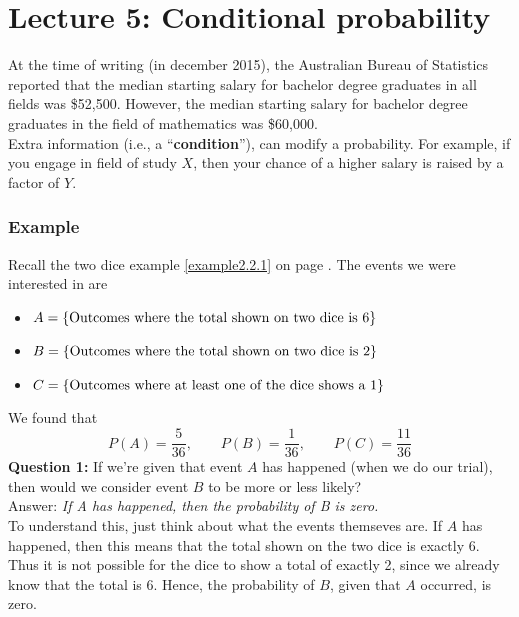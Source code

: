 
\chapter{Lecture 5: Conditional probability}
At the time of writing (in december 2015), the Australian Bureau of Statistics reported that the median starting salary for bachelor degree graduates in all fields was \$52,500. However, the median starting salary for bachelor degree graduates in the field of mathematics was \$60,000. \\

\noindent Extra information (i.e., a ``\textbf{condition}''), can modify a probability. For example, if you engage in field of study $X$, then your chance of a higher salary is raised by a factor of $Y$. \label{condition} \\

\subsection{Example} \label{ex501}
Recall the two dice example \ref{example2.2.1} on page \pageref{example2.2.1}. The events we were interested in are
\begin{itemize}
\item $A = \left\{\text{Outcomes where the total shown on two dice is 6}\right\}$
\item $B = \left\{\text{Outcomes where the total shown on two dice is 2}\right\}$
\item $C = \left\{\text{Outcomes where at least one of the dice shows a 1}\right\}$
\end{itemize}
We found that
\[
P(A) = \frac{5}{36}, \qquad P(B) = \frac{1}{36}, \qquad P(C) = \frac{11}{36}
\]
\textbf{Question 1:} If we're given that event $A$ has happened (when we do our trial), then would we consider event $B$ to be more or less likely? \\
Answer: \textit{If A has happened, then the probability of B is zero.} \\
To understand this, just think about what the events themseves are. If $A$ has happened, then this means that the total shown on the two dice is exactly 6. Thus it is not possible for the dice to show a total of exactly 2, since we already know that the total is 6. Hence, the probability of $B$, given that $A$ occurred, is zero. \\

